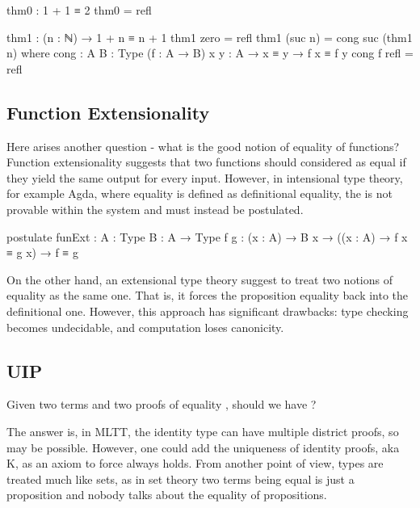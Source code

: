 \begin{code}
thm0 : 1 + 1 ≡ 2
thm0 = refl

thm1 : (n : ℕ) → 1 + n ≡ n + 1
thm1 zero = refl
thm1 (suc n) = cong suc (thm1 n)
  where
  cong : {A B : Type} (f : A → B) {x y : A} → x ≡ y → f x ≡ f y
  cong f refl = refl
\end{code}

\subsection*{Function Extensionality}

Here arises another question - what is the good notion of equality of functions? Function extensionality suggests that two functions should considered as equal if they yield the same output for every input. However, in intensional type theory, for example Agda, where equality is defined as definitional equality, the  is not provable within the system and must instead be postulated.

\begin{code}
postulate
  funExt : {A : Type} {B : A → Type} {f g : (x : A) → B x} →
           ((x : A) → f x ≡ g x) → f ≡ g
\end{code}

On the other hand, an extensional type theory suggest to treat two notions of equality as the same one. That is, it forces the proposition equality back into the definitional one. However, this approach has significant drawbacks: type checking becomes undecidable, and computation loses canonicity.

\subsection*{UIP}

Given two terms  \AgdaSymbol{:}  and two proofs of equality  \AgdaSymbol{:}   , should we have   ?

The answer is, in MLTT, the identity type can have multiple district proofs, so    may be possible. However, one could add the uniqueness of identity proofs, aka K, as an axiom to force    always holds. From another point of view, types are treated much like sets, as in set theory two terms being equal is just a proposition and nobody talks about the equality of propositions.


